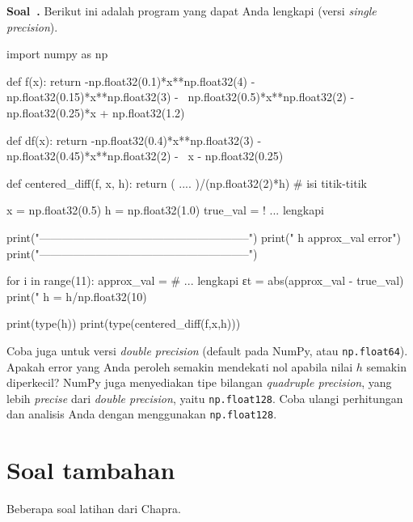 \documentclass[a4paper,11pt,bahasa]{article} %
\newcommand{\txtinline}[1]{\texttt{#1}}
\newcounter{soal}%
\newenvironment{soal}[1][]{\refstepcounter{soal}\par\medskip
   \noindent \textbf{Soal~\thesoal. #1} \sffamily}{\medskip}
\begin{document}
\begin{soal}
Berikut ini adalah program yang dapat Anda lengkapi (versi \textit{single precision}).
\begin{pythoncode}
import numpy as np

def f(x):
  return -np.float32(0.1)*x**np.float32(4) - np.float32(0.15)*x**np.float32(3) - \
  np.float32(0.5)*x**np.float32(2) - np.float32(0.25)*x + np.float32(1.2)
  
def df(x):
  return -np.float32(0.4)*x**np.float32(3) - np.float32(0.45)*x**np.float32(2) - \
  x - np.float32(0.25)
  
def centered_diff(f, x, h):
  return ( .... )/(np.float32(2)*h) # isi titik-titik
  
  x = np.float32(0.5)
  h = np.float32(1.0)
  true_val = ! ... lengkapi
  
  print("--------------------------------------------------------")
  print("           h             approx_val             error")
  print("--------------------------------------------------------")
  
for i in range(11):
  approx_val = # ... lengkapi
  εt = abs(approx_val - true_val)
  print("%
  h = h/np.float32(10)

print(type(h))
print(type(centered_diff(f,x,h)))  
\end{pythoncode}
Coba juga untuk versi \textit{double precision} (default pada NumPy,
atau \txtinline{np.float64}).
Apakah error yang Anda peroleh semakin mendekati nol apabila nilai $h$ semakin
diperkecil?
NumPy juga menyediakan tipe bilangan \textit{quadruple precision}, yang lebih
\textit{precise} dari \textit{double precision}, yaitu
\txtinline{np.float128}. Coba ulangi perhitungan dan analisis Anda dengan
menggunakan \txtinline{np.float128}.
\end{soal}


\section{Soal tambahan}

Beberapa soal latihan dari Chapra.
\end{document}
